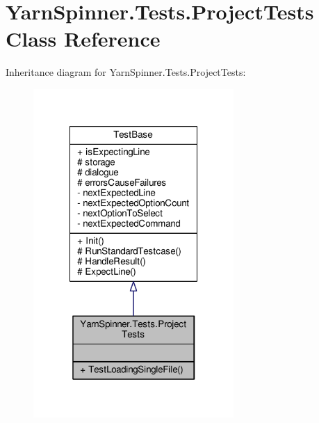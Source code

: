 \hypertarget{a00128}{\section{Yarn\-Spinner.\-Tests.\-Project\-Tests Class Reference}
\label{a00128}
}


Inheritance diagram for Yarn\-Spinner.\-Tests.\-Project\-Tests\-:
\nopagebreak
\begin{figure}[H]
\begin{center}
\leavevmode
\includegraphics[width=216pt]{d0/dab/a00735}
\end{center}
\end{figure}


